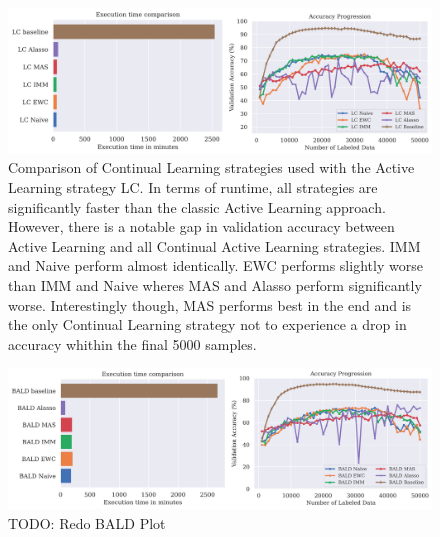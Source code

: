 \begin{figure} [ht]
    \centering
    \includegraphics[width=\linewidth]{images/results_CAL/LC_CAL_1000b.png}
    \caption[Continual Active Learning Random 1000 batch size]{Comparison of Continual Learning strategies used with the Active Learning strategy LC. In terms of runtime, all
    strategies are significantly faster than the classic Active Learning approach. However, there is a notable gap in validation accuracy between Active Learning and all Continual
    Active Learning strategies. IMM and Naive perform almost identically. EWC performs slightly worse than IMM and Naive wheres MAS and Alasso perform significantly worse. Interestingly
    though, MAS performs best in the end and is the only Continual Learning strategy not to experience a  drop in accuracy whithin the final 5000 samples.}
    \label{fig:Evaluation:Results:CAL:LC1000}
\end{figure}

\begin{figure} [ht]
    \centering
    \includegraphics[width=\linewidth]{images/results_CAL/Bald_CAL_1000b.png}
    \caption[Continual Active Learning BALD 1000 batch size]{TODO: Redo BALD Plot}
    \label{fig:Evaluation:Results:CAL:BALD1000}
\end{figure}


